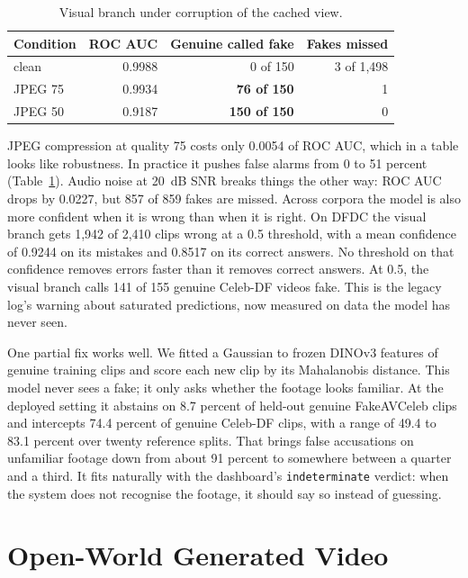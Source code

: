 \begin{table}[ht]
    \centering
    \caption{Visual branch under corruption of the cached view.}
    \label{tab:corruption}
    \begin{tabular}{lrrr}
        \toprule
        \textbf{Condition} & \textbf{ROC AUC} & \textbf{Genuine called fake} & \textbf{Fakes missed} \\
        \midrule
        clean & 0.9988 & 0 of 150 & 3 of 1,498 \\
        JPEG 75 & 0.9934 & \textbf{76 of 150} & 1 \\
        JPEG 50 & 0.9187 & \textbf{150 of 150} & 0 \\
        \bottomrule
    \end{tabular}
\end{table}

JPEG compression at quality 75 costs only 0.0054 of ROC AUC, which in a table
looks like robustness. In practice it pushes false alarms from 0 to 51 percent
(Table~\ref{tab:corruption}). Audio noise at 20~dB SNR breaks things the other
way: ROC AUC drops by 0.0227, but 857 of 859 fakes are missed. Across corpora
the model is also more confident when it is wrong than when it is right. On
DFDC the visual branch gets 1,942 of 2,410 clips wrong at a 0.5 threshold, with
a mean confidence of 0.9244 on its mistakes and 0.8517 on its correct answers.
No threshold on that confidence removes errors faster than it removes correct
answers. At 0.5, the visual branch calls 141 of 155 genuine Celeb-DF videos
fake. This is the legacy log's warning about saturated predictions, now
measured on data the model has never seen.

One partial fix works well. We fitted a Gaussian to frozen DINOv3 features of
genuine training clips and score each new clip by its Mahalanobis distance. This
model never sees a fake; it only asks whether the footage looks familiar. At
the deployed setting it abstains on 8.7 percent of held-out genuine
FakeAVCeleb clips and intercepts 74.4 percent of genuine Celeb-DF clips, with a
range of 49.4 to 83.1 percent over twenty reference splits. That brings false
accusations on unfamiliar footage down from about 91 percent to somewhere
between a quarter and a third. It fits naturally with the dashboard's
\texttt{indeterminate} verdict: when the system does not recognise the
footage, it should say so instead of guessing.

\section{Open-World Generated Video}

